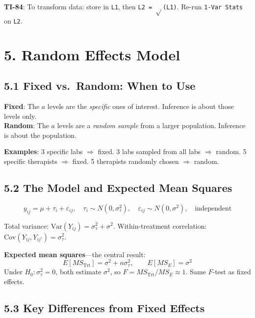 \documentclass[9pt,letterpaper]{article}
\begin{document}
\begin{calcbox}
\textbf{TI-84}: To transform data: store in \texttt{L1}, then \texttt{L2 = $\sqrt{}$(L1)}. Re-run \texttt{1-Var Stats} on \texttt{L2}.
\end{calcbox}

\section{5. Random Effects Model}

\subsection{5.1 Fixed vs.\ Random: When to Use}

\begin{keybox}
\textbf{Fixed}: The $a$ levels are the \emph{specific} ones of interest. Inference is about those levels only.\\
\textbf{Random}: The $a$ levels are a \emph{random sample} from a larger population. Inference is about the population.
\end{keybox}

\textbf{Examples}: 3 specific labs $\Rightarrow$ fixed. 3 labs sampled from all labs $\Rightarrow$ random. 5 specific therapists $\Rightarrow$ fixed. 5 therapists randomly chosen $\Rightarrow$ random.

\subsection{5.2 The Model and Expected Mean Squares}
\[
y_{ij} = \mu + \tau_i + \varepsilon_{ij}, \quad \tau_i \sim N(0, \sigma_\tau^2), \quad \varepsilon_{ij} \sim N(0, \sigma^2), \quad \text{independent}
\]

Total variance: $\text{Var}(Y_{ij}) = \sigma_\tau^2 + \sigma^2$. Within-treatment correlation: $\text{Cov}(Y_{ij}, Y_{ij'}) = \sigma_\tau^2$.

\textbf{Expected mean squares}---the central result:
\[
E[MS_{\text{Trt}}] = \sigma^2 + n\sigma_\tau^2, \qquad E[MS_E] = \sigma^2
\]
Under $H_0: \sigma_\tau^2 = 0$, both estimate $\sigma^2$, so $F = MS_{\text{Trt}}/MS_E \approx 1$. Same $F$-test as fixed effects.

\subsection{5.3 Key Differences from Fixed Effects}
\end{document}
